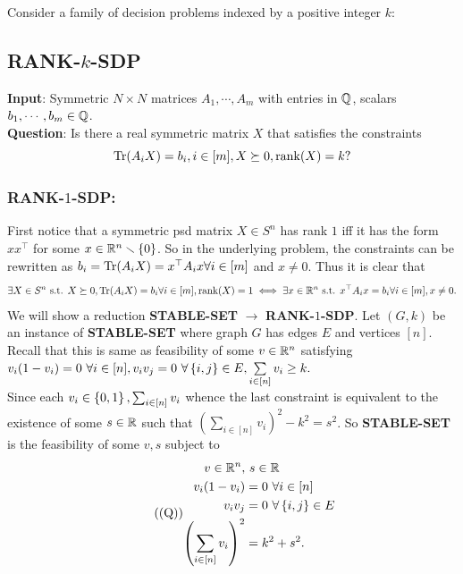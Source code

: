\newpage

\pb

Consider a family of decision problems indexed by a positive integer $k$:
\subsection*{RANK-$k$-SDP}
\textbf{Input}: Symmetric $N\times N$ matrices $A_{1},\cdots,A_{m}$ with entries in $\mathbb{Q}$, scalars $b_{1},\cdots,b_{m} \in\mathbb{Q}$. \\
\textbf{Question}: Is there a real symmetric matrix $X$ that satisfies the constraints
\begin{equation}\label{rk1}\operatorname{Tr}(A_{i}X) = b_{i},i \in[m], X \succeq 0, \operatorname{rank}(X) = k?\end{equation}

\soln

\subsubsection*{RANK-$1$-SDP:}
First notice that a symmetric psd matrix $X\in S^{n}$ has rank $1$ iff it has the form $xx^{\top}$ for some $x\in \mathbb{R}^{n}\smallsetminus\left\{0\right\}$. So in the underlying problem, the constraints can be rewritten as $b_{i}=\operatorname{Tr}(A_{i}X) = x^{\top}A_{i}x\forall i\in[m]$ and $x\ne 0$. Thus it is clear that \begin{equation}\label{ee}\exists X\in S^{n} \text{ s.t. } X\succeq0,\operatorname{Tr}(A_{i}X) = b_{i}\forall i \in[m], \operatorname{rank}(X) =1\iff \exists x\in \mathbb{R}^{n} \text{ s.t. } x^{\top}A_{i}x = b_{i}\forall i\in[m], x\neq0.\end{equation}
We will show a reduction \textbf{STABLE-SET} $\longrightarrow$ \textbf{RANK-$1$-SDP}. Let $(G,k)$ be an instance of \textbf{STABLE-SET} where graph $G$ has edges $E$ and vertices $[n]$. Recall that this is same as feasibility of some $v\in \mathbb{R}^{n}$ satisfying $v_{i}(1-v_{i}) = 0~\forall i\in [n], v_{i}v_{j} = 0 ~\forall \left\{i,j\right\}\in E, \sum\limits_{i\in[n]} v_{i} \ge k.$\\
Since each $v_{i}\in \left\{0,1\right\}, \sum_{i\in[n]} v_{i}$ whence the last constraint is equivalent to the existence of some $s\in \mathbb{R}$ such that $\left(\sum\limits_{i\in[n]} v_{i}\right)^{2} - k^{2}=s^{2}$. So \textbf{STABLE-SET} is the feasibility of some $v,s$ subject to \begin{equation}\tag{(Q)}\label{Q}\begin{aligned}
v\in\mathbb{R}^{n}, &~s\in\mathbb{R}\\
v_{i}(1-v_{i}) &= 0~\forall i\in [n]\\
v_{i}v_{j} &= 0 ~\forall \left\{i,j\right\}\in E\\
\left(\sum_{i\in[n]} v_{i}\right)^{2}&=k^{2}+s^{2}.
\end{aligned}\end{equation}

